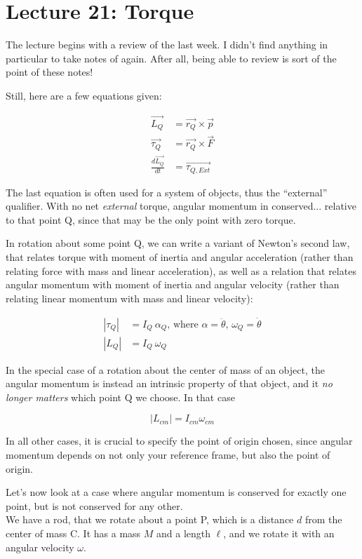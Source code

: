 \section{Lecture 21: Torque}

The lecture begins with a review of the last week. I didn't find anything in particular to take notes of again. After all, being able to review is sort of the point of these notes!

Still, here are a few equations given:

\begin{align}
\vec{L_Q} &= \vec{r_Q} \times \vec{p}\\
\vec{\tau_Q} &= \vec{r_Q} \times \vec{F}\\
\frac{d\vec{L_Q}}{dt} &= \vec{\tau_{Q,Ext}}
\end{align}

The last equation is often used for a system of objects, thus the ``external'' qualifier. With no net \emph{external} torque, angular momentum in conserved... relative to that point Q, since that may be the only point with zero torque.

In rotation about some point Q, we can write a variant of Newton's second law, that relates torque with moment of inertia and angular acceleration (rather than relating force with mass and linear acceleration), as well as a relation that relates angular momentum with moment of inertia and angular velocity (rather than relating linear momentum with mass and linear velocity):

\begin{align}
|\tau_Q| &= I_Q\ \alpha_Q \text{, where $\alpha = \ddot{\theta}$, $\omega_Q = \dot{\theta}$}\\
|L_Q|    &= I_Q\ \omega_Q
\end{align}

In the special case of a rotation about the center of mass of an object, the angular momentum is instead an intrinsic property of that object, and it \emph{no longer matters} which point Q we choose. In that case

\begin{equation}
|L_{cm}| = I_{cm} \omega_{cm}
\end{equation}

In all other cases, it is crucial to specify the point of origin chosen, since angular momentum depends on not only your reference frame, but also the point of origin.

Let's now look at a case where angular momentum is conserved for exactly one point, but is not conserved for any other.\\
We have a rod, that we rotate about a point P, which is a distance $d$ from the center of mass C. It has a mass $M$ and a length $\ell$, and we rotate it with an angular velocity $\omega$.

